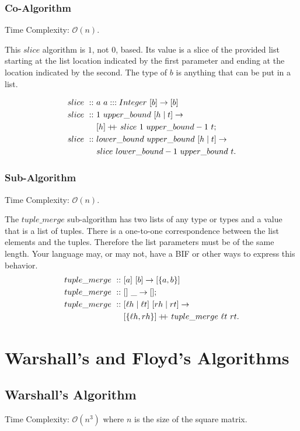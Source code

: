 \documentclass[a4paper,10pt]{book}
\newcommand\doubleplus{+\kern-1.3ex+\kern0.8ex}
\begin{document}
\subsubsection{Co-Algorithm}
Time Complexity: $\mathcal{O}(n)$.

This $slice$ algorithm is $1$, not $0$, based. Its value is a slice of the provided list starting at the list location indicated by the first parameter and ending at the location indicated by the second. The type of $b$ is anything that can be put in a list.

\begin{align*}
slice\ ::\ &a\ a:::Integer\ [b]\rightarrow [b]\\
slice\ ::\ &1\ upper\_bound\ [h\mid t]\rightarrow\\
	&[h]\doubleplus slice\ 1\ upper\_bound-1\ t;\\
slice\ ::\ &lower\_bound\ upper\_bound\ [h\mid t]\rightarrow\\
	&slice\ lower\_bound - 1\ upper\_bound\ t.
\end{align*}


\subsubsection{Sub-Algorithm}
Time Complexity: $\mathcal{O}(n)$.

The $tuple\_merge$ sub-algorithm has two lists of any type or types and a value that is a list of tuples. There is a one-to-one correspondence between the list elements and the tuples. Therefore the list parameters must be of the same length. Your language may, or may not, have a BIF or other ways to express this behavior.
\begin{align*}
tuple\_merge\ ::\ &[a]\ [b]\rightarrow [\{a,b\}]\\
tuple\_merge\ ::\ &[]\ \_\rightarrow [];\\
tuple\_merge\ ::\ &[\ell h\mid \ell t]\ [rh\mid rt]\rightarrow\\
	&[\{\ell h,rh\}]\doubleplus tuple\_merge\ \ell t\ rt. 
\end{align*}
\section{Warshall's and Floyd's Algorithms}
\subsection{Warshall's Algorithm}
Time Complexity: $\mathcal{O}(n^3)$ where $n$ is the size of the square matrix.
\end{document}
